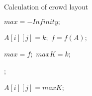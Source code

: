 \documentclass[11pt]{ctexart}
\begin{document}
  
	\begin{algorithm}[h]  
		\caption{Calculation of crowd layout}  
		\begin{algorithmic}[1]  
			
			
			
			\State $max=-Infinity;$
			
			
			
			
			\label{code:TrainBase:getc}  
			\State $A[i][j]=k;$
			\State $f=f(A);$  
			
			\State $max=f;$ 
			\State $maxK=k;$ 
			\EndIf
			
			\label{code:TrainBase:pos}  
			\EndFor; %
			
			\State $A[i][j]=maxK$;
			
			\EndFor
			
			\EndFor  
			
			
			
			\label{code:recentEnd}  
		\end{algorithmic}  
	\end{algorithm}  
\end{document}
